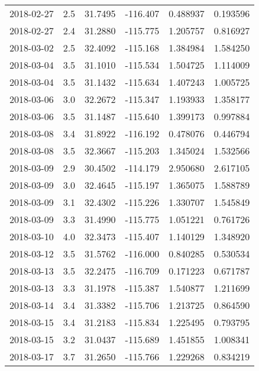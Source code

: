 \begin{tabular}{lrrrrr}
2018-02-27 &       2.5 &  31.7495 &  -116.407 &         0.488937 &         0.193596 \\
2018-02-27 &       2.4 &  31.2880 &  -115.775 &         1.205757 &         0.816927 \\
2018-03-02 &       2.5 &  32.4092 &  -115.168 &         1.384984 &         1.584250 \\
2018-03-04 &       3.5 &  31.1010 &  -115.534 &         1.504725 &         1.114009 \\
2018-03-04 &       3.5 &  31.1432 &  -115.634 &         1.407243 &         1.005725 \\
2018-03-06 &       3.0 &  32.2672 &  -115.347 &         1.193933 &         1.358177 \\
2018-03-06 &       3.5 &  31.1487 &  -115.640 &         1.399173 &         0.997884 \\
2018-03-08 &       3.4 &  31.8922 &  -116.192 &         0.478076 &         0.446794 \\
2018-03-08 &       3.5 &  32.3667 &  -115.203 &         1.345024 &         1.532566 \\
2018-03-09 &       2.9 &  30.4502 &  -114.179 &         2.950680 &         2.617105 \\
2018-03-09 &       3.0 &  32.4645 &  -115.197 &         1.365075 &         1.588789 \\
2018-03-09 &       3.1 &  32.4302 &  -115.226 &         1.330707 &         1.545849 \\
2018-03-09 &       3.3 &  31.4990 &  -115.775 &         1.051221 &         0.761726 \\
2018-03-10 &       4.0 &  32.3473 &  -115.407 &         1.140129 &         1.348920 \\
2018-03-12 &       3.5 &  31.5762 &  -116.000 &         0.840285 &         0.530534 \\
2018-03-13 &       3.5 &  32.2475 &  -116.709 &         0.171223 &         0.671787 \\
2018-03-13 &       3.3 &  31.1978 &  -115.387 &         1.540877 &         1.211699 \\
2018-03-14 &       3.4 &  31.3382 &  -115.706 &         1.213725 &         0.864590 \\
2018-03-15 &       3.4 &  31.2183 &  -115.834 &         1.225495 &         0.793795 \\
2018-03-15 &       3.2 &  31.0437 &  -115.689 &         1.451855 &         1.008341 \\
2018-03-17 &       3.7 &  31.2650 &  -115.766 &         1.229268 &         0.834219 \\

\end{tabular}

